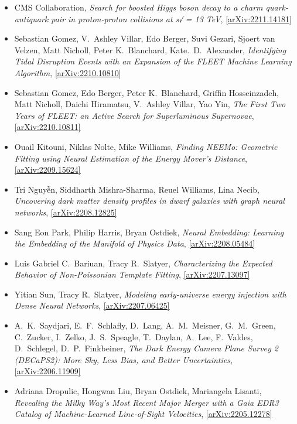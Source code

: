 \begin{itemize}
\item CMS Collaboration, \textit{Search for boosted Higgs boson decay to a charm quark-antiquark pair in proton-proton collisions at s√ = 13 TeV}, \href{https://arxiv.org/abs/2211.14181}{[arXiv:2211.14181]} 
\item Sebastian Gomez, V.\  Ashley Villar, Edo Berger, Suvi Gezari, Sjoert van Velzen, Matt Nicholl, Peter K.\  Blanchard, Kate.\  D.\  Alexander, \textit{Identifying Tidal Disruption Events with an Expansion of the FLEET Machine Learning Algorithm}, \href{https://arxiv.org/abs/2210.10810}{[arXiv:2210.10810]} 
\item Sebastian Gomez, Edo Berger, Peter K.\  Blanchard, Griffin Hosseinzadeh, Matt Nicholl, Daichi Hiramatsu, V.\  Ashley Villar, Yao Yin, \textit{The First Two Years of FLEET: an Active Search for Superluminous Supernovae}, \href{https://arxiv.org/abs/2210.10811}{[arXiv:2210.10811]} 
\item Ouail Kitouni, Niklas Nolte, Mike Williams, \textit{Finding NEEMo: Geometric Fitting using Neural Estimation of the Energy Mover's Distance}, \href{https://arxiv.org/abs/2209.15624}{[arXiv:2209.15624]} 
\item Tri Nguyễn, Siddharth Mishra-Sharma, Reuel Williams, Lina Necib, \textit{Uncovering dark matter density profiles in dwarf galaxies with graph neural networks}, \href{https://arxiv.org/abs/2208.12825}{[arXiv:2208.12825]} 
\item Sang Eon Park, Philip Harris, Bryan Ostdiek, \textit{Neural Embedding: Learning the Embedding of the Manifold of Physics Data}, \href{https://arxiv.org/abs/2208.05484}{[arXiv:2208.05484]} 
\item Luis Gabriel C.\  Bariuan, Tracy R.\  Slatyer, \textit{Characterizing the Expected Behavior of Non-Poissonian Template Fitting}, \href{https://arxiv.org/abs/2207.13097}{[arXiv:2207.13097]} 
\item Yitian Sun, Tracy R.\  Slatyer, \textit{Modeling early-universe energy injection with Dense Neural Networks}, \href{https://arxiv.org/abs/2207.06425}{[arXiv:2207.06425]} 
\item A.\  K.\  Saydjari, E.\  F.\  Schlafly, D.\  Lang, A.\  M.\  Meisner, G.\  M.\  Green, C.\  Zucker, I.\  Zelko, J.\  S.\  Speagle, T.\  Daylan, A.\  Lee, F.\  Valdes, D.\  Schlegel, D.\  P.\  Finkbeiner, \textit{The Dark Energy Camera Plane Survey 2 (DECaPS2): More Sky, Less Bias, and Better Uncertainties}, \href{https://arxiv.org/abs/2206.11909}{[arXiv:2206.11909]} 
\item Adriana Dropulic, Hongwan Liu, Bryan Ostdiek, Mariangela Lisanti, \textit{Revealing the Milky Way's Most Recent Major Merger with a Gaia EDR3 Catalog of Machine-Learned Line-of-Sight Velocities}, \href{https://arxiv.org/abs/2205.12278}{[arXiv:2205.12278]} 

\end{itemize}
